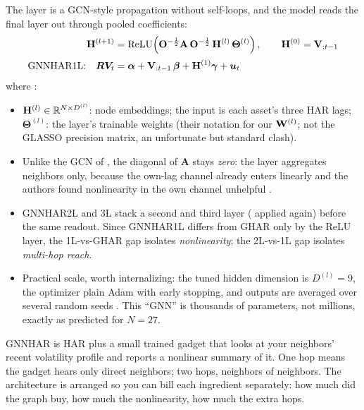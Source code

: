 The layer is a GCN-style propagation without self-loops, and the model reads the final layer out through pooled coefficients:
\begin{align}
  \mathbf{H}^{(l+1)} &= \operatorname{ReLU}\!\left( \mathbf{O}^{-\frac{1}{2}} \mathbf{A}\, \mathbf{O}^{-\frac{1}{2}}\, \mathbf{H}^{(l)}\, \bm{\Theta}^{(l)} \right),
  \qquad \mathbf{H}^{(0)} = \mathbf{V}_{:t-1} \label{eq:gnn:gnnhar-layer}\\[2pt]
  \text{GNNHAR1L:}\quad \boldsymbol{RV}_t &= \boldsymbol{\alpha} + \mathbf{V}_{:t-1}\,\bm{\beta} + \mathbf{H}^{(1)}\bm{\gamma} + \boldsymbol{u}_t \label{eq:gnn:gnnhar1l}
\end{align}
where \citep[eqs.~7--8, pp.~9--10]{ZhangCucuringuDong2023}:
\begin{itemize}[nosep]
  \item $\mathbf{H}^{(l)} \in \mathbb{R}^{N \times D^{(l)}}$: node embeddings; the input is each asset's three HAR lags; $\bm{\Theta}^{(l)}$: the layer's trainable weights (their notation for our $\mathbf{W}^{(l)}$; not the GLASSO precision matrix, an unfortunate but standard clash).
  \item Unlike the GCN of , the diagonal of $\mathbf{A}$ stays \emph{zero}: the layer aggregates neighbors only, because the own-lag channel already enters linearly and the authors found nonlinearity in the own channel unhelpful \citep[footnote~8, p.~10]{ZhangCucuringuDong2023}.
  \item GNNHAR2L and 3L stack a second and third layer ( applied again) before the same readout. Since GNNHAR1L differs from GHAR only by the ReLU layer, the 1L-vs-GHAR gap isolates \emph{nonlinearity}; the 2L-vs-1L gap isolates \emph{multi-hop reach}.
  \item Practical scale, worth internalizing: the tuned hidden dimension is $D^{(l)} = 9$, the optimizer plain Adam with early stopping, and outputs are averaged over several random seeds \citep[p.~14, App.~B p.~34]{ZhangCucuringuDong2023}. This ``GNN'' is thousands of parameters, not millions, exactly as  predicted for $N = 27$.
\end{itemize}

\begin{intuition}
GNNHAR is HAR plus a small trained gadget that looks at your neighbors' recent volatility profile and reports a nonlinear summary of it. One hop means the gadget hears only direct neighbors; two hops, neighbors of neighbors. The architecture is arranged so you can bill each ingredient separately: how much did the graph buy, how much the nonlinearity, how much the extra hops.
\end{intuition}

